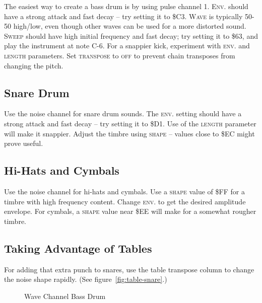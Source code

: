 The easiest way to create a bass drum is by using pulse channel 1. \textsc{Env.} should have a strong attack and fast decay -- try setting it to \$C3. \textsc{Wave} is typically 50-50 high/low, even though other waves can be used for a more distorted sound. \textsc{Sweep} should have high initial frequency and fast decay; try setting it to \$63, and play the instrument at note C-6. For a snappier kick, experiment with \textsc{env.} and \textsc{length} parameters. Set \textsc{transpose} to \textsc{off} to prevent chain transposes from changing the pitch.

\subsection{Snare Drum}

Use the noise channel for snare drum sounds. The \textsc{env.} setting should have a strong attack and fast decay -- try setting it to \$D1. Use of the \textsc{length} parameter will make it snappier. Adjust the timbre using \textsc{shape} -- values close to \$EC might prove useful.

\subsection{Hi-Hats and Cymbals}

Use the noise channel for hi-hats and cymbals. Use a \textsc{shape} value of \$FF for a timbre with high frequency content. Change \textsc{env.} to get the desired amplitude envelope. For cymbals, a \textsc{shape} value near \$EE will make for a somewhat rougher timbre.

\subsection{Taking Advantage of Tables}

For adding that extra punch to snares, use the table transpose column to change the noise shape rapidly. (See figure~\ref{fig:table-snare}.)

\begin{figure}[hbtp]
	\centering
	\qquad

	\qquad

	\caption{Wave Channel Bass Drum}
	\label{fig:wavekick}
\end{figure}

